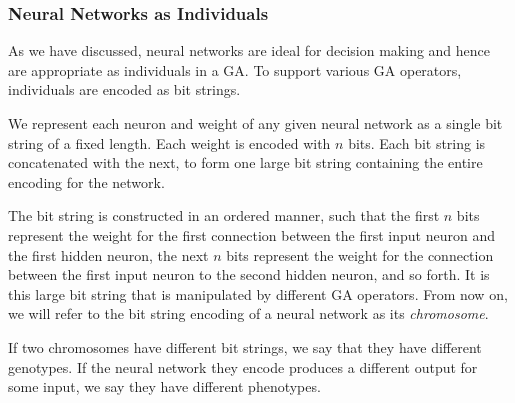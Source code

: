 \subsubsection{Neural Networks as Individuals}

As we have discussed, neural networks are ideal for decision making and hence are appropriate as individuals in a GA. To support various GA operators, individuals are encoded as bit strings.


We represent each neuron and weight of any given neural network as a single bit string of a fixed length. Each weight is encoded with $n$ bits. Each bit string is concatenated with the next, to form one large bit string containing the entire encoding for the network.

The bit string is constructed in an ordered manner, such that the first $n$ bits represent the weight for the first connection between the first input neuron and the first hidden neuron, the next $n$ bits represent the weight for the connection between the first input neuron to the second hidden neuron, and so forth. It is this large bit string that is manipulated by different GA operators. From now on, we will refer to the bit string encoding of a neural network as its \emph{chromosome}.




%
If two chromosomes have different bit strings, we say that they have different genotypes. If the neural network they encode produces a different output for some input, we say they have different phenotypes.
